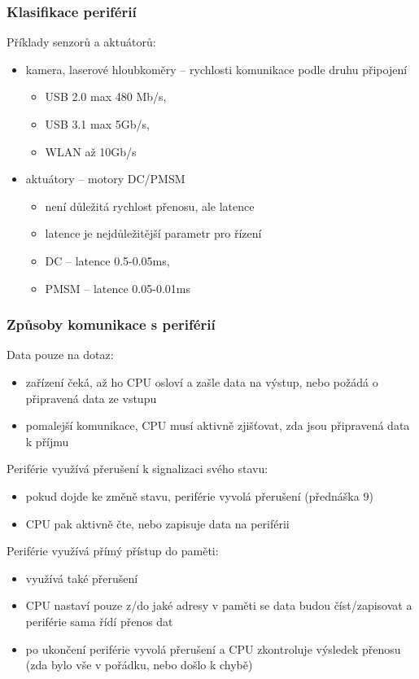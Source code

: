 \documentclass{beamer}
\begin{document}
\begin{frame}
\frametitle{Klasifikace periférií}

Příklady senzorů a aktuátorů:
\begin{itemize}
\item kamera, laserové hloubkoměry -- rychlosti komunikace podle druhu připojení
\begin{itemize}
\item USB 2.0 max 480 Mb/s, 
\item USB 3.1 max 5Gb/s, 
\item WLAN až 10Gb/s
\end{itemize}
\item aktuátory -- motory DC/PMSM 
\begin{itemize}
\item není důležitá rychlost přenosu, ale latence
\item latence je nejdůležitější parametr pro řízení
\item DC -- latence 0.5-0.05ms, 
\item PMSM -- latence 0.05-0.01ms
\end{itemize}
\end{itemize}

\end{frame}



\begin{frame}
\frametitle{Způsoby komunikace s periférií}
Data pouze na dotaz:
\begin{itemize}
\item zařízení čeká, až ho CPU osloví a zašle data na výstup, nebo požádá o připravená data ze vstupu
\item pomalejší komunikace, CPU musí aktivně zjišťovat, zda jsou připravená data k příjmu
\end{itemize}

Periférie využívá přerušení k signalizaci svého stavu:
\begin{itemize}
\item pokud dojde ke změně stavu, periférie vyvolá přerušení (přednáška 9)
\item CPU pak aktivně čte, nebo zapisuje data na periférii
\end{itemize}

Periférie využívá přímý přístup do paměti:
\begin{itemize}
\item využívá také přerušení
\item CPU nastaví pouze z/do jaké adresy v paměti se data budou číst/zapisovat a periférie sama řídí přenos dat
\item po ukončení periférie vyvolá přerušení a CPU zkontroluje výsledek přenosu (zda bylo vše v pořádku, nebo došlo k chybě)
\end{itemize}

\end{frame}
\end{document}
